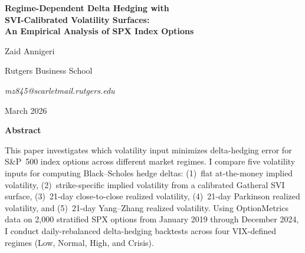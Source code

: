 \documentclass[12pt, letterpaper]{article}
\begin{document}
\begin{titlepage}
\centering
\vspace*{2cm}

{\LARGE\bfseries Regime-Dependent Delta Hedging with\\[0.3cm]
SVI-Calibrated Volatility Surfaces:\\[0.3cm]
An Empirical Analysis of SPX Index Options\par}

\vspace{2cm}

{\Large Zaid Annigeri\par}

\vspace{1cm}

{\large
Rutgers Business School\par}

\vspace{0.5cm}

{\normalsize
\textit{mz845@scarletmail.rutgers.edu}\par}

\vspace{2cm}

{\large March 2026\par}

\vfill

\end{titlepage}

\newpage
\thispagestyle{plain}
\begin{center}
{\Large\bfseries Abstract}
\end{center}

\noindent
This paper investigates which volatility input minimizes delta-hedging error for S\&P~500 index options across different market regimes. I compare five volatility inputs for computing Black--Scholes hedge deltas: (1)~flat at-the-money implied volatility, (2)~strike-specific implied volatility from a calibrated Gatheral SVI surface, (3)~21-day close-to-close realized volatility, (4)~21-day Parkinson realized volatility, and (5)~21-day Yang--Zhang realized volatility. Using OptionMetrics data on 2,000 stratified SPX options from January 2019 through December 2024, I conduct daily-rebalanced delta-hedging backtests across four VIX-defined regimes (Low, Normal, High, and Crisis).
\end{document}
